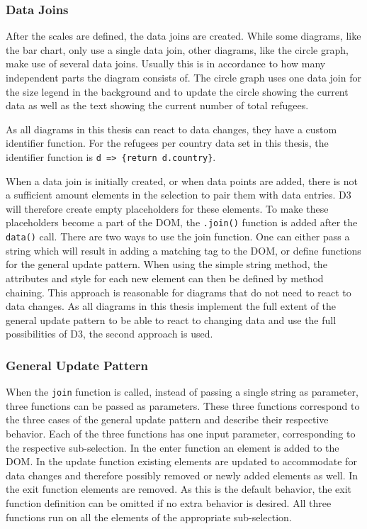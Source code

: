 \subsubsection{Data Joins}
After the scales are defined, the data joins are created. While some diagrams, like the bar chart, only use a single data join, other diagrams, like the circle graph, make use of several data joins. Usually this is in accordance to how many independent parts the diagram consists of. The circle graph uses one data join for the size legend in the background and to update the circle showing the current data as well as the text showing the current number of total refugees.

As all diagrams in this thesis can react to data changes, they have a custom identifier function. For the refugees per country data set in this thesis, the identifier function is \verb|d => {return d.country}|.

When a data join is initially created, or when data points are added, there is not a sufficient amount elements in the selection to pair them with data entries. D3 will therefore create empty placeholders for these elements. To make these placeholders become a part of the DOM, the \verb|.join()| function is added after the \texttt{data()} call. There are two ways to use the join function. One can either pass a string which will result in adding a matching tag to the DOM, or define functions for the general update pattern. When using the simple string method, the attributes and style for each new element can then be defined by method chaining. This approach is reasonable for diagrams that do not need to react to data changes. As all diagrams in this thesis implement the full extent of the general update pattern to be able to react to changing data and use the full possibilities of D3, the second approach is used.

\subsubsection{General Update Pattern}

When the \texttt{join} function is called, instead of passing a single string as parameter, three functions can be passed as parameters. These three functions correspond to the three cases of the general update pattern and describe their respective behavior. Each of the three functions has one input parameter, corresponding to the respective sub-selection. In the enter function an element is added to the DOM. In the update function existing elements are updated to accommodate for data changes and therefore possibly removed or newly added elements as well. In the exit function elements are removed. As this is the default behavior, the exit function definition can be omitted if no extra behavior is desired. All three functions run on all the elements of the appropriate sub-selection.

